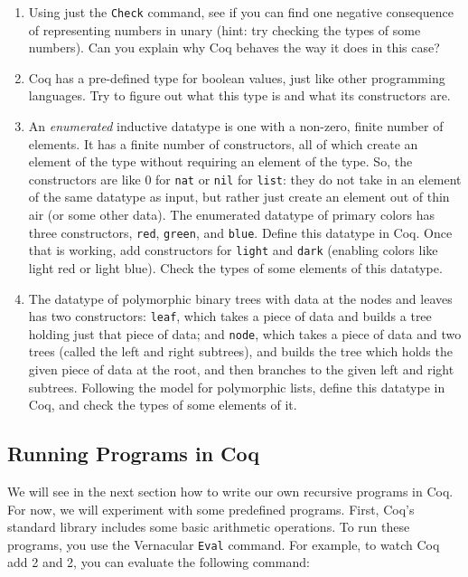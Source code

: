 \documentclass{book}[12pt]
\begin{document}
\begin{enumerate}
\item Using just the \texttt{Check} command, see if you can find one
negative consequence of representing numbers in unary (hint: try
checking the types of some numbers).  Can you explain why Coq behaves
the way it does in this case?
\item Coq has a pre-defined type for boolean values, just like other
programming languages.  Try to figure out what this type is and what
its constructors are.
\item An \emph{enumerated} inductive datatype is one with a non-zero,
finite number of elements.  It has a finite number of constructors,
all of which create an element of the type without requiring an
element of the type.  So, the constructors are like $0$ for \texttt{nat}
or \texttt{nil} for \texttt{list}: they do not take in an element of
the same datatype as input, but rather just create an element out of
thin air (or some other data).  The enumerated datatype of primary colors
has three constructors, \texttt{red}, \texttt{green}, and \texttt{blue}.
Define this datatype in Coq.  Once that is working, add constructors for
\texttt{light} and \texttt{dark} (enabling colors like light red or light
blue).  Check the types of some elements of this datatype.
\item The datatype of polymorphic binary trees with data at the nodes
and leaves has two constructors: \texttt{leaf}, which takes a piece of
data and builds a tree holding just that piece of data; and
\texttt{node}, which takes a piece of data and two trees (called the
left and right subtrees), and builds the tree which holds the given
piece of data at the root, and then branches to the given left and
right subtrees.  Following the model for polymorphic lists, define
this datatype in Coq, and check the types of some elements of it.
\end{enumerate}

\subsection{Running Programs in Coq}

We will see in the next section how to write our own recursive
programs in Coq.  For now, we will experiment with some predefined
programs.  First, Coq's standard library includes some basic
arithmetic operations.  To run these programs, you use the Vernacular
\texttt{Eval} command.  For example, to watch Coq add 2 and 2, you can
evaluate the following command:
\end{document}
